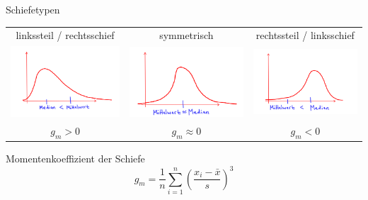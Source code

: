 \documentclass[t,11pt,aspectratio=169]{beamer}
\begin{document}
\begin{frame}
Schiefetypen
\begin{center}
	\begin{tabular}{ccc}
		linkssteil / rechtsschief & symmetrisch & rechtssteil / linksschief  \\
		\includegraphics[scale=0.15]{1.png} & \includegraphics[scale=0.15]{2.png} & \includegraphics[scale=0.15]{3.png}  \\ 
		$g_m>0$ & $g_m\approx0$ & $g_m<0$
	\end{tabular} 
\end{center}
Momentenkoeffizient der Schiefe
$$g_m = \frac{1}{n} \sum_{i=1}^{n} \left(  \frac{x_i - \bar{x}}{s} \right)^3 $$
\end{frame}
	
\end{document}
